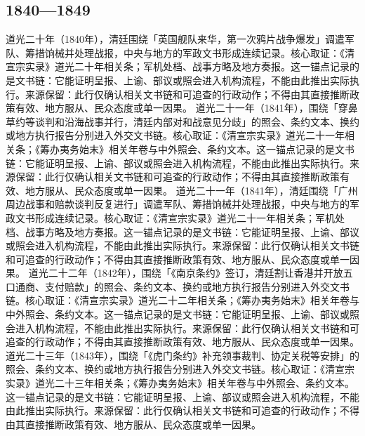 \subsection{1840—1849}
道光二十年（1840年），清廷围绕「英国舰队来华，第一次鸦片战争爆发」调遣军队、筹措饷械并处理战报，中央与地方的军政文书形成连续记录。核心取证：《清宣宗实录》道光二十年相关条；军机处档、战事方略及地方奏报。这一锚点记录的是文书链：它能证明呈报、上谕、部议或照会进入机构流程，不能由此推出实际执行。来源保留：此行仅确认相关文书链和可追查的行政动作；不得由其直接推断政策有效、地方服从、民众态度或单一因果。
道光二十一年（1841年），围绕「穿鼻草约等谈判和沿海战事并行，清廷内部对和战意见分歧」的照会、条约文本、换约或地方执行报告分别进入外交文书链。核心取证：《清宣宗实录》道光二十一年相关条；《筹办夷务始末》相关年卷与中外照会、条约文本。这一锚点记录的是文书链：它能证明呈报、上谕、部议或照会进入机构流程，不能由此推出实际执行。来源保留：此行仅确认相关文书链和可追查的行政动作；不得由其直接推断政策有效、地方服从、民众态度或单一因果。
道光二十一年（1841年），清廷围绕「广州周边战事和赔款谈判反复进行」调遣军队、筹措饷械并处理战报，中央与地方的军政文书形成连续记录。核心取证：《清宣宗实录》道光二十一年相关条；军机处档、战事方略及地方奏报。这一锚点记录的是文书链：它能证明呈报、上谕、部议或照会进入机构流程，不能由此推出实际执行。来源保留：此行仅确认相关文书链和可追查的行政动作；不得由其直接推断政策有效、地方服从、民众态度或单一因果。
道光二十二年（1842年），围绕「《南京条约》签订，清廷割让香港并开放五口通商、支付赔款」的照会、条约文本、换约或地方执行报告分别进入外交文书链。核心取证：《清宣宗实录》道光二十二年相关条；《筹办夷务始末》相关年卷与中外照会、条约文本。这一锚点记录的是文书链：它能证明呈报、上谕、部议或照会进入机构流程，不能由此推出实际执行。来源保留：此行仅确认相关文书链和可追查的行政动作；不得由其直接推断政策有效、地方服从、民众态度或单一因果。
道光二十三年（1843年），围绕「《虎门条约》补充领事裁判、协定关税等安排」的照会、条约文本、换约或地方执行报告分别进入外交文书链。核心取证：《清宣宗实录》道光二十三年相关条；《筹办夷务始末》相关年卷与中外照会、条约文本。这一锚点记录的是文书链：它能证明呈报、上谕、部议或照会进入机构流程，不能由此推出实际执行。来源保留：此行仅确认相关文书链和可追查的行政动作；不得由其直接推断政策有效、地方服从、民众态度或单一因果。
